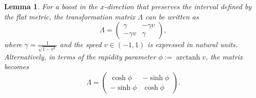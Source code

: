 \documentclass{amsart}
\newtheorem{lemma}[theorem]{Lemma}
\theoremstyle{remark}
\DeclareMathOperator{\arctanh}{arctanh}
\begin{document}
\begin{lemma}
  For a boost in the $x$-direction that preserves the interval defined by the flat metric, the transformation matrix $\Lambda$ can be written as
  \[
  \Lambda =
  \begin{pmatrix}
    \gamma & -\gamma v \\
    -\gamma v & \gamma
  \end{pmatrix},
  \]
  where $\gamma = \frac{1}{\sqrt{1 - v^2}}$ and the \emph{speed} $v \in (-1,1)$ is expressed in natural units. Alternatively, in terms of the \emph{rapidity} parameter $\phi := \arctanh v$, the matrix becomes
  \[
  \Lambda =
  \begin{pmatrix}
    \cosh \phi & -\sinh \phi \\
    -\sinh \phi & \cosh \phi
  \end{pmatrix}.
  \]
\end{lemma}
\end{document}
